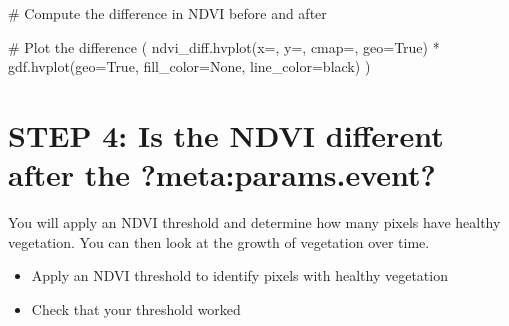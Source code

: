 \documentclass[
  letterpaper,
  DIV=11,
  numbers=noendperiod,
  oneside]{scrreprt}
\newenvironment{Shaded}{\begin{snugshade}}{\end{snugshade}}
\newcommand{\CommentTok}[1]{\textcolor[rgb]{0.37,0.37,0.37}{#1}}
\newcommand{\NormalTok}[1]{\textcolor[rgb]{0.00,0.23,0.31}{#1}}
\newcommand{\OperatorTok}[1]{\textcolor[rgb]{0.37,0.37,0.37}{#1}}
\newcommand{\StringTok}[1]{\textcolor[rgb]{0.13,0.47,0.30}{#1}}
\newcommand{\VariableTok}[1]{\textcolor[rgb]{0.07,0.07,0.07}{#1}}
\providecommand{\tightlist}{%
  \setlength{\itemsep}{0pt}\setlength{\parskip}{0pt}}
\begin{document}
\begin{Shaded}
\begin{Highlighting}[]
\CommentTok{\# Compute the difference in NDVI before and after}

\CommentTok{\# Plot the difference}
\NormalTok{(}
\NormalTok{    ndvi\_diff.hvplot(x}\OperatorTok{=}\StringTok{\textquotesingle{}\textquotesingle{}}\NormalTok{, y}\OperatorTok{=}\StringTok{\textquotesingle{}\textquotesingle{}}\NormalTok{, cmap}\OperatorTok{=}\StringTok{\textquotesingle{}\textquotesingle{}}\NormalTok{, geo}\OperatorTok{=}\VariableTok{True}\NormalTok{)}
    \OperatorTok{*}
\NormalTok{    gdf.hvplot(geo}\OperatorTok{=}\VariableTok{True}\NormalTok{, fill\_color}\OperatorTok{=}\VariableTok{None}\NormalTok{, line\_color}\OperatorTok{=}\StringTok{\textquotesingle{}black\textquotesingle{}}\NormalTok{)}
\NormalTok{)}
\end{Highlighting}
\end{Shaded}


\chapter{\texorpdfstring{STEP 4: Is the NDVI different after the
\textbf{?meta:params.event}?}{STEP 4: Is the NDVI different after the ?meta:params.event?}}\label{step-4-is-the-ndvi-different-after-the}

You will apply an NDVI threshold and determine how many pixels have
healthy vegetation. You can then look at the growth of vegetation over
time.

\begin{tcolorbox}[enhanced jigsaw, colbacktitle=quarto-callout-color!10!white, opacityback=0, bottomtitle=1mm, toptitle=1mm, bottomrule=.15mm, left=2mm, colframe=quarto-callout-color-frame, leftrule=.75mm, opacitybacktitle=0.6, colback=white, rightrule=.15mm, toprule=.15mm, breakable, titlerule=0mm, title=\textcolor{quarto-callout-color}{\faInfo}\hspace{0.5em}{Try It}, coltitle=black, arc=.35mm]

\begin{itemize}
\tightlist
\item
  Apply an NDVI threshold to identify pixels with healthy vegetation
\item
  Check that your threshold worked
\end{itemize}

\end{tcolorbox}
\end{document}
